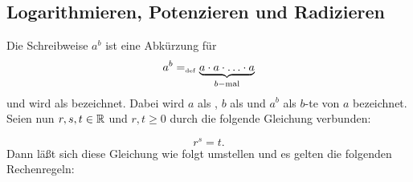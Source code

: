 \subsection{Logarithmieren, Potenzieren und Radizieren}
Die Schreibweise $a^b$ ist eine Abkürzung für 
\begin{displaymath}
a^b =_{\mathrm{\scriptscriptstyle def}} \underbrace{a \cdot a
\cdot \ldots \cdot a}_{b-\text{mal}} 
\end{displaymath}
und wird als  bezeichnet. Dabei wird $a$ als
, $b$ als  und $a^b$ als $b$-te
 von $a$ bezeichnet.  Seien nun 
$r,s,t \in \mathbb R$ und $r,t \ge 0$ durch die folgende Gleichung verbunden:

\begin{displaymath}
r^s = t.
\end{displaymath}
Dann läßt sich diese Gleichung wie folgt umstellen und es gelten die
folgenden Rechenregeln:


